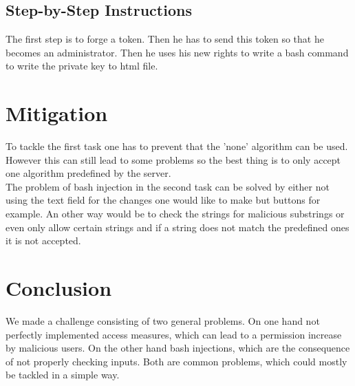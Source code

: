 \documentclass[12pt,a4paper]{article}
\begin{document}
\subsection{Step-by-Step Instructions}
The first step is to forge a token. Then he has to send this token so that he becomes an administrator. Then he uses his new rights to write a bash command to write the private key to html file.
\section{Mitigation}

To tackle the first task one has to prevent that the 'none' algorithm can be used. However this can still lead to some problems so the best thing is to only accept one algorithm predefined by the server.\\
The problem of bash injection in the second task can be solved by either not using the text field for the changes one would like to make but buttons for example. An other way would be to check the strings for malicious substrings or even only allow certain strings and if a string does not match the predefined ones it is not accepted.

\section{Conclusion}
We made a challenge consisting of two general problems. On one hand not perfectly implemented access measures, which can lead to a permission increase by malicious users. On the other hand bash injections, which are the consequence of not properly checking inputs. Both are common problems, which could mostly be tackled in a simple way.
\end{document}
